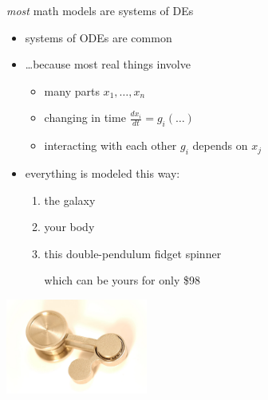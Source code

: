 \documentclass[urlcolor=blue,dvipsnames]{beamer}
\begin{document}
\begin{frame}{\emph{most} math models are systems of DEs}

\begin{itemize}
\item systems of ODEs are \alert{common}
\item \dots because most real things involve

    \begin{itemize}
    \item \alert{many parts} \hfill $x_1,\dots,x_n$

\medskip
    \item \alert{changing in time} \hfill $\frac{dx_i}{dt}=g_i(\dots)$

\medskip
    \item \alert{interacting with each other} \hfill $g_i$ depends on $x_j$
    \end{itemize}

\bigskip
\item everything is modeled this way:
    \begin{enumerate}
    \item the galaxy
    \item your body
    \item this double-pendulum fidget spinner

which can be yours for only \$98
    \end{enumerate}
\end{itemize}

\vspace{-15mm}
\hfill \includegraphics[width=0.35\textwidth]{figs/double-pendulum-fidget}
\end{frame}
\end{document}
